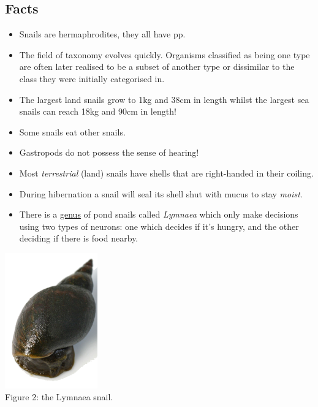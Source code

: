 \documentclass[twoside]{article}
\begin{document}
\begin{multicols}{2}

    \begin{minipage}{0.4\textwidth}
    \section*{Facts}
        \begin{itemize}
            \item Snails are hermaphrodites, they all have pp.
            \item The field of \gls{taxonomy} evolves quickly. Organisms classified as being one type are often later realised to be a subset of another type or dissimilar to the class they were initially categorised in.
            \item The largest land snails grow to 1kg and 38cm in length whilst the largest sea snails can reach 18kg and 90cm in length!
            \item Some snails eat other snails.
            \item Gastropods do not possess the sense of hearing!
            \item Most \emph{terrestrial} (land) snails have shells that are right-handed in their coiling.
            \item During hibernation a snail will seal its shell shut with mucus to stay \emph{moist}.
            \item There is a \underline{genus} of pond snails called \emph{Lymnaea} which only make decisions using two types of neurons: one which decides if it's hungry, and the other deciding if there is food nearby.
        \end{itemize}
        \begin{center}
            \includegraphics[width=0.3\textwidth]{img/vege.png}\\
            Figure 2: the Lymnaea snail.
        \end{center}
    \end{minipage}


\end{multicols}
\end{document}
